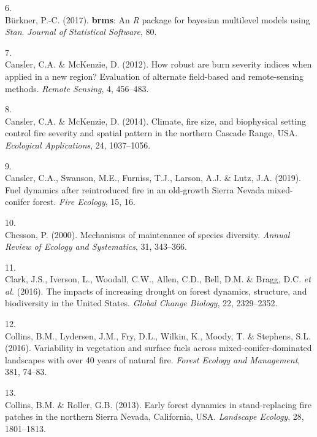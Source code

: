 \documentclass[]{article}
\begin{document}
\leavevmode\hypertarget{ref-burkner2017}{}%
6.\\
Bürkner, P.-C. (2017). \textbf{brms}: An \emph{R} package for bayesian
multilevel models using \emph{Stan}. \emph{Journal of Statistical
Software}, 80.

\leavevmode\hypertarget{ref-cansler2012}{}%
7.\\
Cansler, C.A. \& McKenzie, D. (2012). How robust are burn severity
indices when applied in a new region? Evaluation of alternate
field-based and remote-sensing methods. \emph{Remote Sensing}, 4,
456--483.

\leavevmode\hypertarget{ref-cansler2014}{}%
8.\\
Cansler, C.A. \& McKenzie, D. (2014). Climate, fire size, and
biophysical setting control fire severity and spatial pattern in the
northern Cascade Range, USA. \emph{Ecological Applications}, 24,
1037--1056.

\leavevmode\hypertarget{ref-cansler2019}{}%
9.\\
Cansler, C.A., Swanson, M.E., Furniss, T.J., Larson, A.J. \& Lutz, J.A.
(2019). Fuel dynamics after reintroduced fire in an old-growth Sierra
Nevada mixed-conifer forest. \emph{Fire Ecology}, 15, 16.

\leavevmode\hypertarget{ref-chesson2000}{}%
10.\\
Chesson, P. (2000). Mechanisms of maintenance of species diversity.
\emph{Annual Review of Ecology and Systematics}, 31, 343--366.

\leavevmode\hypertarget{ref-clark2016}{}%
11.\\
Clark, J.S., Iverson, L., Woodall, C.W., Allen, C.D., Bell, D.M. \&
Bragg, D.C. \emph{et al.} (2016). The impacts of increasing drought on
forest dynamics, structure, and biodiversity in the United States.
\emph{Global Change Biology}, 22, 2329--2352.

\leavevmode\hypertarget{ref-collins2016}{}%
12.\\
Collins, B.M., Lydersen, J.M., Fry, D.L., Wilkin, K., Moody, T. \&
Stephens, S.L. (2016). Variability in vegetation and surface fuels
across mixed-conifer-dominated landscapes with over 40 years of natural
fire. \emph{Forest Ecology and Management}, 381, 74--83.

\leavevmode\hypertarget{ref-collins2013}{}%
13.\\
Collins, B.M. \& Roller, G.B. (2013). Early forest dynamics in
stand-replacing fire patches in the northern Sierra Nevada, California,
USA. \emph{Landscape Ecology}, 28, 1801--1813.
\end{document}

